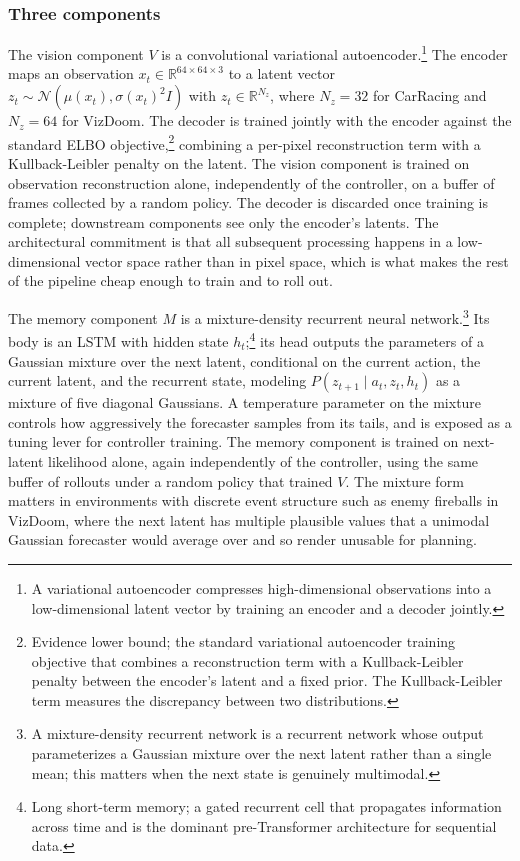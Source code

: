 \subsubsection{Three components}
\label{section:fc_ha_schmidhuber_components}

The vision component $V$ is a convolutional variational autoencoder.\footnote{A variational autoencoder compresses high-dimensional observations into a low-dimensional latent vector by training an encoder and a decoder jointly.} The encoder maps an observation $x_t \in \mathbb{R}^{64 \times 64 \times 3}$ to a latent vector $z_t \sim \mathcal{N}(\mu(x_t), \sigma(x_t)^2 I)$ with $z_t \in \mathbb{R}^{N_z}$, where $N_z = 32$ for CarRacing and $N_z = 64$ for VizDoom. The decoder is trained jointly with the encoder against the standard ELBO objective,\footnote{Evidence lower bound; the standard variational autoencoder training objective that combines a reconstruction term with a Kullback-Leibler penalty between the encoder's latent and a fixed prior. The Kullback-Leibler term measures the discrepancy between two distributions.} combining a per-pixel reconstruction term with a Kullback-Leibler penalty on the latent. The vision component is trained on observation reconstruction alone, independently of the controller, on a buffer of frames collected by a random policy. The decoder is discarded once training is complete; downstream components see only the encoder's latents. The architectural commitment is that all subsequent processing happens in a low-dimensional vector space rather than in pixel space, which is what makes the rest of the pipeline cheap enough to train and to roll out.

The memory component $M$ is a mixture-density recurrent neural network.\footnote{A mixture-density recurrent network is a recurrent network whose output parameterizes a Gaussian mixture over the next latent rather than a single mean; this matters when the next state is genuinely multimodal.} Its body is an LSTM with hidden state $h_t$;\footnote{Long short-term memory; a gated recurrent cell that propagates information across time and is the dominant pre-Transformer architecture for sequential data.} its head outputs the parameters of a Gaussian mixture over the next latent, conditional on the current action, the current latent, and the recurrent state, modeling $P(z_{t+1} \mid a_t, z_t, h_t)$ as a mixture of five diagonal Gaussians. A temperature parameter on the mixture controls how aggressively the forecaster samples from its tails, and is exposed as a tuning lever for controller training. The memory component is trained on next-latent likelihood alone, again independently of the controller, using the same buffer of rollouts under a random policy that trained $V$. The mixture form matters in environments with discrete event structure such as enemy fireballs in VizDoom, where the next latent has multiple plausible values that a unimodal Gaussian forecaster would average over and so render unusable for planning.

